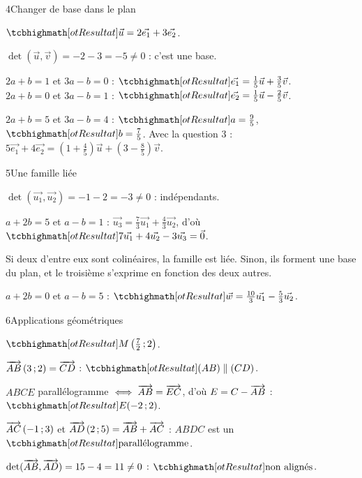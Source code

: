 \begin{deuxcolonnes}
\begin{corrige}{4}{Changer de base dans le plan}
\begin{questions}
  \item $\res{\vec u=2\vec{e_1}+3\vec{e_2}}$.
  \item $\det(\vec u,\vec v)=-2-3=-5\neq0$ : c'est une base.
  \item $2a+b=1$ et $3a-b=0$ : $\res{\vec{e_1}=\tfrac15\vec u+\tfrac35\vec v}$.\\
    $2a+b=0$ et $3a-b=1$ : $\res{\vec{e_2}=\tfrac15\vec u-\tfrac25\vec v}$.
  \item $2a+b=5$ et $3a-b=4$ : $\res{a=\tfrac95}$, $\res{b=\tfrac75}$. Avec la question 3 :\\
    $5\vec{e_1}+4\vec{e_2}=\left(1+\frac45\right)\vec u+\left(3-\frac85\right)\vec v$.
\end{questions}
\end{corrige}

\begin{corrige}{5}{Une famille liée}
\begin{questions}
  \item $\det(\vec{u_1},\vec{u_2})=-1-2=-3\neq0$ : indépendants.
  \item $a+2b=5$ et $a-b=1$ : $\vec{u_3}=\frac73\vec{u_1}+\frac43\vec{u_2}$, d'où $\res{7\vec{u_1}+4\vec{u_2}-3\vec{u_3}=\vec0}$.
  \item Si deux d'entre eux sont colinéaires, la famille est liée. Sinon, ils forment une base du plan, et le troisième s'exprime en
    fonction des deux autres.
  \item $a+2b=0$ et $a-b=5$ : $\res{\vec w=\tfrac{10}{3}\vec{u_1}-\tfrac53\vec{u_2}}$.
\end{questions}
\end{corrige}

\begin{corrige}{6}{Applications géométriques}
\begin{questions}
  \item $\res{M\left(\tfrac72\pv2\right)}$.
  \item $\overrightarrow{AB}\,(3\,{;}\,2)=\overrightarrow{CD}$ : $\res{(AB)\parallel(CD)}$.
  \item $ABCE$ parallélogramme $\iff\overrightarrow{AB}=\overrightarrow{EC}$, d'où $E=C-\overrightarrow{AB}$ : $\res{E(-2\pv2)}$.
  \item $\overrightarrow{AC}\,(-1\,{;}\,3)$ et $\overrightarrow{AD}\,(2\,{;}\,5)=\overrightarrow{AB}+\overrightarrow{AC}$ : $ABDC$ est un $\res{\text{parallélogramme}}$.
  \item $\det(\overrightarrow{AB},\overrightarrow{AD})=15-4=11\neq0$ : $\res{\text{non alignés}}$.
\end{questions}
\end{corrige}


\end{deuxcolonnes}
